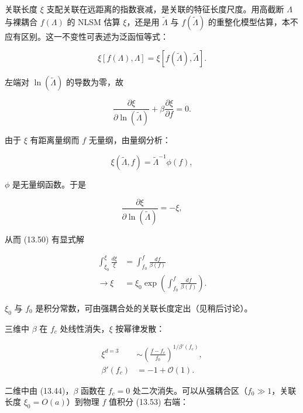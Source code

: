 关联长度 $\xi$ 支配关联在远距离的指数衰减，是关联的特征长度尺度。用高截断 $\Lambda$ 与裸耦合 $f(\Lambda)$ 的 NLSM 估算 $\xi$，还是用 $\tilde{\Lambda}$ 与 $f(\tilde{\Lambda})$ 的重整化模型估算，本不应有区别。这一不变性可表述为泛函恒等式：

\begin{equation*}
\xi [ f ( \Lambda ), \Lambda ] = \xi [ f ( \tilde {\Lambda} ), \tilde {\Lambda} ].
\tag{13.49}
\end{equation*}

左端对 $\ln (\tilde{\Lambda})$ 的导数为零，故

\begin{equation*}
\frac {\partial \xi}{\partial \ln ( \tilde {\Lambda} )} + \beta \frac {\partial \xi}{\partial f} = 0.
\tag{13.50}
\end{equation*}

由于 $\xi$ 有距离量纲而 $f$ 无量纲，由量纲分析：

\begin{equation*}
\xi ( \tilde {\Lambda}, f ) = \tilde {\Lambda} ^ {- 1} \phi ( f ) ,
\tag{13.51}
\end{equation*}

$\phi$ 是无量纲函数。于是

\begin{equation*}
\frac {\partial \xi}{\partial \ln ( \tilde {\Lambda} )} = - \xi ,
\tag{13.52}
\end{equation*}

从而 (13.50) 有显式解

\begin{align*}
\int_{\xi_ {0}} ^ {\xi} \frac {d \xi}{\xi} & = \int_{f_ {0}} ^ {f} \frac {d f}{\beta ( f )}\\
\rightarrow \xi & = \xi_ {0} \exp \left( \int_{f_ {0}} ^ {f} \frac {d f}{\beta ( f )} \right) .
\tag{13.53}
\end{align*}

$\xi_{0}$ 与 $f_{0}$ 是积分常数，可由强耦合处的关联长度定出（见稍后讨论）。

三维中 $\beta$ 在 $f_{c}$ 处线性消失，$\xi$ 按幂律发散：

\begin{align*}
\xi^ {d = 3} & \sim \left( \frac {f - f _ {c}}{f _ {0}} \right) ^ {1 / \beta ' ( f _ {c} )} ,\\
\beta ' ( f _ {c} ) & = - 1 + \mathcal {O} ( 1 ) .
\tag{13.54}
\end{align*}

二维中由 (13.44)，$\beta$ 函数在 $f_{c}=0$ 处二次消失。可以从强耦合区（$f_{0} \gg 1$，关联长度 $\xi_{0}=O(a)$）到物理 $f$ 值积分 (13.53) 右端：

